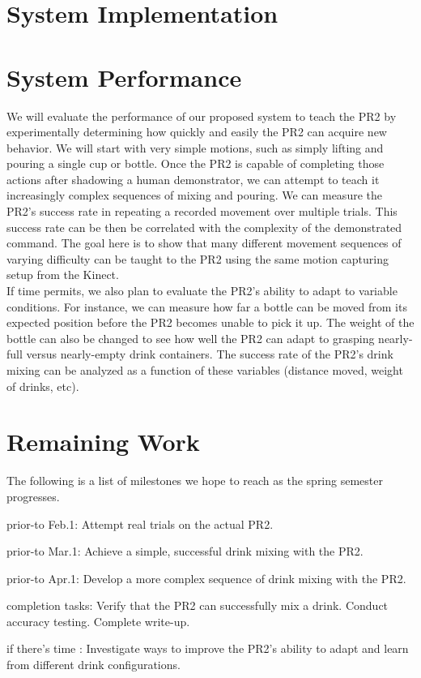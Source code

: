 \documentclass{sig-alternate}
\begin{document}
\section{System Implementation}

\section{System Performance}
\label{subsec:eval_criteria}
We will evaluate the performance of our proposed system to teach the PR2 by experimentally determining how quickly and easily the PR2
can acquire new behavior. We will start with very simple motions, such as simply lifting and pouring a single cup or bottle. Once the PR2 is capable of completing those actions after shadowing a human demonstrator, we can attempt to teach it increasingly complex sequences of mixing and pouring. We can measure the PR2's success rate in repeating a recorded movement over multiple trials. This success rate can be then be correlated with the complexity of the demonstrated command. The goal here is to show that many different movement sequences of varying difficulty can be taught to the PR2 using the same motion capturing setup from the Kinect.\\
If time permits, we also plan to evaluate the PR2's ability to adapt to variable conditions. For instance, we can measure how far a bottle can be moved from its expected position before the PR2 becomes unable to pick it up. The weight of the bottle can also be changed to see how well the PR2 can adapt to grasping nearly-full versus nearly-empty drink containers. The success rate of the PR2's drink mixing can be analyzed as a function of these variables (distance moved, weight of drinks, etc).

\section{Remaining Work}
\label{sec:remaining_work}
The following is a list of milestones we hope to reach as the spring semester progresses.

\begin{itemize*}
	\item {\sc prior-to Feb.1}: Attempt real trials on the actual PR2.\vspace{3pt}
	\item {\sc prior-to Mar.1}: Achieve a simple, successful drink mixing with the PR2.\vspace{3pt}
	\item {\sc prior-to Apr.1}: Develop a more complex sequence of drink mixing with the PR2.\vspace{3pt}
	\item {\sc completion tasks}: Verify that the PR2 can successfully mix a drink. Conduct accuracy testing. Complete write-up.\vspace{3pt}
	\item {\sc if there's time} : Investigate ways to improve the PR2's ability to adapt and learn from different drink configurations.
\end{itemize*}

\end{document}
